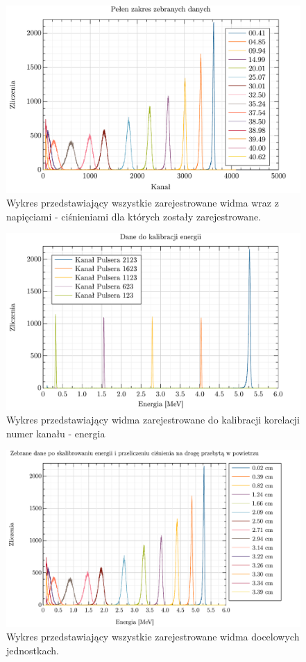 \documentclass[pra,
superscriptaddress,
amssymb,amsmath,amsmath,showpacs,reprint,twocolumn]{revtex4-1}
\begin{document}
\begin{figure}[h!]
    \centering
    \includegraphics[keepaspectratio, width=0.8\linewidth]{peaks.pdf}
    \caption{Wykres przedstawiający wszystkie zarejestrowane widma wraz z napięciami - ciśnieniami dla których zostały zarejestrowane.}
    \label{fig:wyniki_raw}
\end{figure}

\begin{figure}[h!]
    \centering
    \includegraphics[keepaspectratio, width=0.8\linewidth]{peaks_kalibracja_energy.pdf}
    \caption{Wykres przedstawiający widma zarejestrowane do kalibracji korelacji numer kanału - energia}
    \label{fig:kal_energie}
\end{figure}

\begin{figure}[h!]
    \centering
    \includegraphics[keepaspectratio, width=0.8\linewidth]{peaks_energy.pdf}
    \caption{Wykres przedstawiający wszystkie zarejestrowane widma docelowych jednostkach.}
    \label{fig:dane_przeliczone}
\end{figure}
\end{document}
